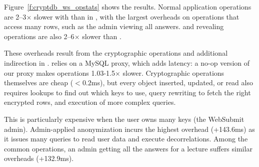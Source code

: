 %
Figure~\ref{f:cryptdb_ws_opstats} shows the results.
%
Normal application operations are 2--3$\times$ slower with \syscrypt than in
\sys, with the largest overheads on operations that access many rows, such as
the admin viewing all answers.
%
\Xxing and revealing operations are also 2--6$\times$ slower than \sys.
%

%
These overheads result from the cryptographic operations and additional
indirection in \syscrypt.
%
\syscrypt relies on a MySQL proxy, which adds latency: a no-op
version of our proxy makes operations 1.03-1.5$\times$ slower.
%
%
Cryptographic operations themselves are cheap ($<0.2$ms), but every object
inserted, updated, or read also requires lookups to find out which keys
to use, query rewriting to fetch the right encrypted rows, and
execution of more complex queries.
%

%
This is particularly expensive
when the user owns many keys (\eg the WebSubmit admin).
%
%
%
%
%
Admin-applied anonymization incurs the highest overhead (+143.6ms) as it issues
many queries to read user data and execute decorrelations.
%
Among the common operations,
an admin getting all the answers for a lecture
suffers similar overheads (+132.9ms).
%
%

